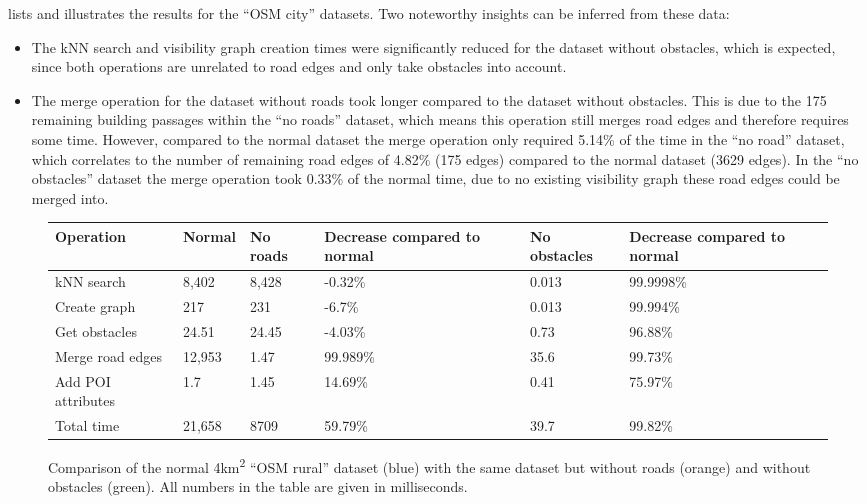 			 lists and illustrates the results for the \enquote{OSM city} datasets.
			Two noteworthy insights can be inferred from these data:
			\begin{itemize}
				\item The kNN search and visibility graph creation times were significantly reduced for the dataset without obstacles, which is expected, since both operations are unrelated to road edges and only take obstacles into account.
				\item The merge operation for the dataset without roads took longer compared to the dataset without obstacles.
				This is due to the 175 remaining building passages within the \enquote{no roads} dataset, which means this operation still merges road edges and therefore requires some time.
				However, compared to the normal dataset the merge operation only required 5.14\% of the time in the \enquote{no road} dataset, which correlates to the number of remaining road edges of 4.82\% (175 edges) compared to the normal dataset (3629 edges).
				In the \enquote{no obstacles} dataset the merge operation took 0.33\% of the normal time, due to no existing visibility graph these road edges could be merged into.
			\end{itemize}
			
			\begin{figure}[h!]
				\begin{tabularx}{0.95\textwidth}{p{3cm}|X|XX|p{2.25cm}X}
\textbf{Operation} & \textbf{Normal} & \textbf{No roads} & \textbf{Decrease compared to normal} & \textbf{No obstacles} & \textbf{Decrease compared to normal} \\
\hline
kNN search			& 8,402		& 8,428		& -0.32\%						& 0.013			& 99.9998\%						\\
Create graph		& 217		& 231		& -6.7\%						& 0.013			& 99.994\%						\\
Get obstacles		& 24.51		& 24.45		& -4.03\%						& 0.73			& 96.88\%						\\
Merge road edges	& 12,953	& 1.47		& 99.989\%						& 35.6			& 99.73\%						\\
Add POI attributes	& 1.7		& 1.45		& 14.69\%						& 0.41			& 75.97\%						\\
\hline
Total time			& 21,658	& 8709		& 59.79\%						& 39.7			& 99.82\%
				\end{tabularx}
				\vspace{3ex}
				\begin{figcenter}
					
				\end{figcenter}
				\caption{Comparison of the normal 4km\textsuperscript{2} \enquote{OSM rural} dataset (blue) with the same dataset but without roads (orange) and without obstacles (green). All numbers in the table are given in milliseconds.}
				\label{fig:eval-import-osm-no-roads-obstacles-rural}
			\end{figure}
			
